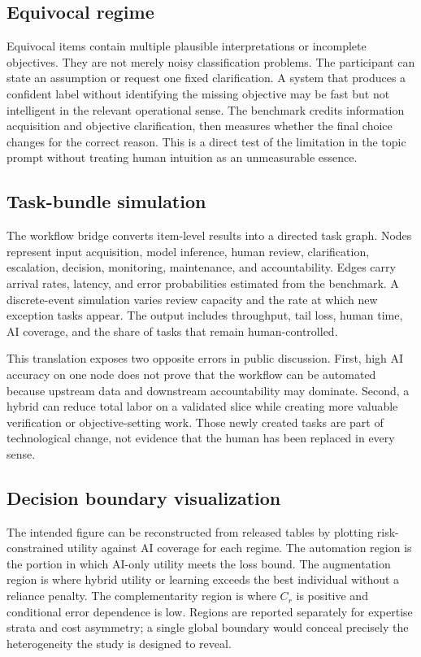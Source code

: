 \documentclass[conference]{IEEEtran}
\begin{document}
\subsection{Equivocal regime}

Equivocal items contain multiple plausible interpretations or incomplete objectives. They are not merely noisy classification problems. The participant can state an assumption or request one fixed clarification. A system that produces a confident label without identifying the missing objective may be fast but not intelligent in the relevant operational sense. The benchmark credits information acquisition and objective clarification, then measures whether the final choice changes for the correct reason. This is a direct test of the limitation in the topic prompt without treating human intuition as an unmeasurable essence.

\subsection{Task-bundle simulation}

The workflow bridge converts item-level results into a directed task graph. Nodes represent input acquisition, model inference, human review, clarification, escalation, decision, monitoring, maintenance, and accountability. Edges carry arrival rates, latency, and error probabilities estimated from the benchmark. A discrete-event simulation varies review capacity and the rate at which new exception tasks appear. The output includes throughput, tail loss, human time, AI coverage, and the share of tasks that remain human-controlled.

This translation exposes two opposite errors in public discussion. First, high AI accuracy on one node does not prove that the workflow can be automated because upstream data and downstream accountability may dominate. Second, a hybrid can reduce total labor on a validated slice while creating more valuable verification or objective-setting work. Those newly created tasks are part of technological change, not evidence that the human has been replaced in every sense.

\subsection{Decision boundary visualization}

The intended figure can be reconstructed from released tables by plotting risk-constrained utility against AI coverage for each regime. The automation region is the portion in which AI-only utility meets the loss bound. The augmentation region is where hybrid utility or learning exceeds the best individual without a reliance penalty. The complementarity region is where $C_r$ is positive and conditional error dependence is low. Regions are reported separately for expertise strata and cost asymmetry; a single global boundary would conceal precisely the heterogeneity the study is designed to reveal.
\end{document}
